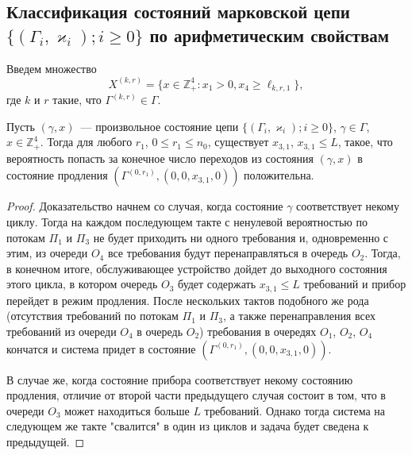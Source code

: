 \documentclass[a4paper,12pt,russian]{extarticle}
\newcommand{\Mark}{\{(\Gamma_i, \varkappa_i); i \geqslant 0\}}
\begin{document}
\subsection{Классификация состояний марковской цепи $\Mark$ по арифметическим свойствам}
Введем множество 
\begin{equation*}
X^{(k,r)} = \{x \in \mathbb{Z}_+^4 \colon x_1 > 0, x_4 \geqslant \ell_{k,r,1}\},
\end{equation*}
где $k$ и $r$ такие, что $\Gamma^{(k,r)}\in \Gamma$. 

\begin{lemma}
Пусть $(\gamma,x)$~--- произвольное состояние цепи $\Mark$, $\gamma\in \Gamma$, $x \in \mathbb{Z}_+^4$. Тогда для любого $r_1$, $0\leqslant r_1 \leqslant n_0$, существует $x_{3,1}$, $x_{3,1} \leqslant L$, такое, что вероятность попасть за конечное число переходов из состояния $(\gamma,x)$ в состояние продления $(\Gamma^{(0,r_1)}, (0,0,x_{3,1},0))$ положительна.
\label{lemma:1}
\end{lemma}
\begin{proof}
Доказательство начнем со случая, когда состояние $\gamma$ соответствует некому циклу. Тогда на каждом последующем такте с ненулевой вероятностью по потокам $\Pi_1$ и $\Pi_3$ не будет приходить ни одного требования и, одновременно с этим, из очереди $O_4$ все требования будут перенаправляться в очередь $O_2$. Тогда, в конечном итоге, обслуживающее устройство дойдет до выходного состояния этого цикла, в котором очередь $O_3$ будет содержать $x_{3,1} \leqslant L$ требований и прибор перейдет в режим продления. После нескольких тактов подобного же рода (отсутствия требований по потокам $\Pi_1$ и $\Pi_3$, а также перенаправления всех требований из очереди $O_4$ в очередь $O_2$) требования в очередях $O_1$, $O_2$, $O_4$ кончатся и система придет в состояние $(\Gamma^{(0,r_1)}, (0,0,x_{3,1},0))$.

В случае же, когда состояние прибора соответствует некому состоянию продления, отличие от второй части предыдущего случая состоит в том, что в очереди $O_3$ может находиться больше $L$ требований. Однако тогда система на следующем же такте "свалится" в один из циклов и задача будет сведена к предыдущей. 
\end{proof}
\end{document}
